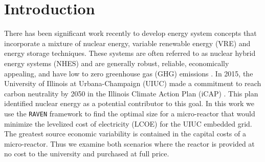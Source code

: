 \section{Introduction}

There has been significant work recently to develop energy system concepts that incorporate a mixture of nuclear energy, variable renewable energy (VRE) and energy storage techniques. These systems are often referred to as nuclear hybrid energy systems (NHES) and are generally robust, reliable, economically appealing, and have low to zero greenhouse gas (GHG) emissions \cite{baker_optimal_2018,ruth_nuclear-renewable_2014,ruth_economic_2016,suman_hybrid_2018-1}. In 2015, the University of Illinois at Urbana-Champaign (UIUC) made a commitment to reach carbon neutrality by 2050 in the Illinois Climate Action Plan (iCAP) \cite{isee_illinois_2015}. This plan identified nuclear energy as a potential contributor to this goal. In this work we use the \texttt{RAVEN} framework to find the optimal size for a micro-reactor that would minimize the levelized cost of electricity (LCOE) for the UIUC embedded grid. The greatest source economic variability is contained in the capital costs of a micro-reactor. Thus we examine both scenarios where the reactor is provided at no cost to the university and purchased at full price. 